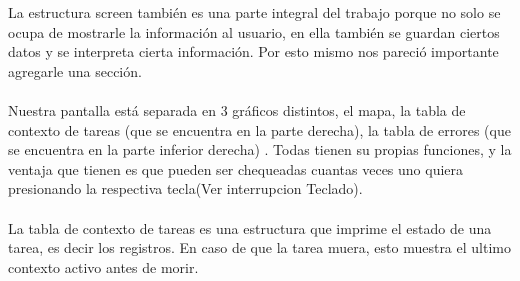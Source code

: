 La estructura screen tambi\'en es una parte integral del trabajo porque no solo se ocupa de mostrarle
la informaci\'on al usuario, en ella tambi\'en se guardan ciertos datos y se interpreta cierta informaci\'on.
Por esto mismo nos pareci\'o importante agregarle una secci\'on.\\
\\
Nuestra pantalla est\'a separada en 3 gr\'aficos distintos, el mapa, 
la tabla de contexto de tareas (que se encuentra en la parte derecha), la tabla de errores (que se encuentra en la parte inferior derecha) . Todas tienen su propias funciones, y la ventaja que tienen es que pueden ser chequeadas cuantas veces uno quiera presionando la respectiva tecla(Ver interrupcion Teclado).\\
\\
La tabla de contexto de tareas es una estructura que imprime el estado de una tarea, es decir los registros. En caso de que la tarea muera,
esto muestra el ultimo contexto activo antes de morir.\\


